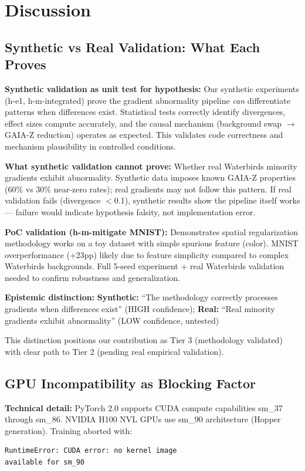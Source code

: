 \section{Discussion}

\subsection{Synthetic vs Real Validation: What Each Proves}

\textbf{Synthetic validation as unit test for hypothesis:}
Our synthetic experiments (h-e1, h-m-integrated) prove the gradient abnormality pipeline \emph{can} differentiate patterns when differences exist. Statistical tests correctly identify divergences, effect sizes compute accurately, and the causal mechanism (background swap $\rightarrow$ GAIA-Z reduction) operates as expected. This validates code correctness and mechanism plausibility in controlled conditions.

\textbf{What synthetic validation cannot prove:}
Whether real Waterbirds minority gradients exhibit abnormality. Synthetic data imposes known GAIA-Z properties (60\% vs 30\% near-zero rates); real gradients may not follow this pattern. If real validation fails (divergence $<$0.1), synthetic results show the pipeline itself works --- failure would indicate hypothesis falsity, not implementation error.

\textbf{PoC validation (h-m-mitigate MNIST):}
Demonstrates spatial regularization methodology works on a toy dataset with simple spurious feature (color). MNIST overperformance (+23pp) likely due to feature simplicity compared to complex Waterbirds backgrounds. Full 5-seed experiment + real Waterbirds validation needed to confirm robustness and generalization.

\textbf{Epistemic distinction:}
\textbf{Synthetic:} ``The methodology correctly processes gradients when differences exist'' (HIGH confidence);
\textbf{Real:} ``Real minority gradients exhibit abnormality'' (LOW confidence, untested)

This distinction positions our contribution as Tier 3 (methodology validated) with clear path to Tier 2 (pending real empirical validation).

\subsection{GPU Incompatibility as Blocking Factor}

\textbf{Technical detail:} PyTorch 2.0 supports CUDA compute capabilities sm\_37 through sm\_86. NVIDIA H100 NVL GPUs use sm\_90 architecture (Hopper generation). Training aborted with:
\begin{verbatim}
RuntimeError: CUDA error: no kernel image
available for sm_90
\end{verbatim}

